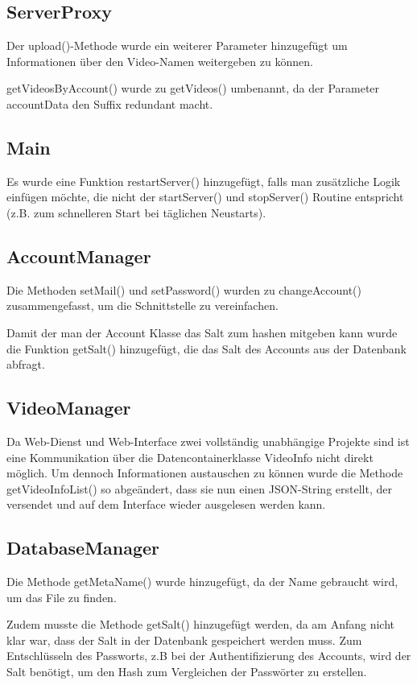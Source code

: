 \subsection{ServerProxy}
Der upload()-Methode wurde ein weiterer Parameter hinzugefügt um Informationen über den Video-Namen weitergeben zu können.  \par  

getVideosByAccount() wurde zu getVideos() umbenannt, da der Parameter accountData den Suffix redundant macht.

\subsection{Main}
Es wurde eine Funktion restartServer() hinzugefügt, falls man zusätzliche Logik einfügen möchte, die nicht der startServer() und stopServer() Routine entspricht (z.B. zum schnelleren Start bei täglichen Neustarts).

\subsection{AccountManager}
Die Methoden setMail() und setPassword() wurden zu changeAccount() zusammengefasst, um die Schnittstelle zu vereinfachen.  \par  

Damit der man der Account Klasse das Salt zum hashen mitgeben kann wurde die Funktion getSalt() hinzugefügt, die das Salt des Accounts aus der Datenbank abfragt.

\subsection{VideoManager} \label{sec:VideoManager}
Da Web-Dienst und Web-Interface zwei vollständig unabhängige Projekte sind ist eine Kommunikation über die Datencontainerklasse VideoInfo nicht direkt möglich. Um dennoch Informationen austauschen zu können wurde die Methode getVideoInfoList() so abgeändert, dass sie nun einen JSON-String erstellt, der versendet und auf dem Interface wieder ausgelesen werden kann.

\subsection{DatabaseManager}
Die Methode getMetaName() wurde hinzugefügt, da der Name gebraucht wird, um das File zu finden. \par

Zudem musste die Methode getSalt() hinzugefügt werden, da am Anfang nicht klar war, dass der Salt in der Datenbank gespeichert werden muss. Zum Entschlüsseln des Passworts, z.B bei der Authentifizierung des Accounts, wird der Salt benötigt, um den Hash zum Vergleichen der Passwörter zu erstellen.

